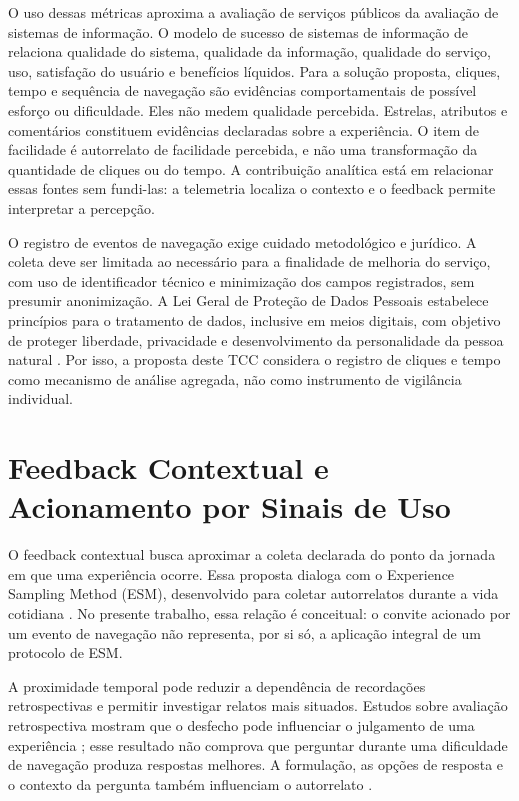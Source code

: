 O uso dessas métricas aproxima a avaliação de serviços públicos da avaliação de sistemas de informação. O modelo de sucesso de sistemas de informação de  relaciona qualidade do sistema, qualidade da informação, qualidade do serviço, uso, satisfação do usuário e benefícios líquidos. Para a solução proposta, cliques, tempo e sequência de navegação são evidências comportamentais de possível esforço ou dificuldade. Eles não medem qualidade percebida. Estrelas, atributos e comentários constituem evidências declaradas sobre a experiência. O item de facilidade é autorrelato de facilidade percebida, e não uma transformação da quantidade de cliques ou do tempo. A contribuição analítica está em relacionar essas fontes sem fundi-las: a telemetria localiza o contexto e o feedback permite interpretar a percepção.

O registro de eventos de navegação exige cuidado metodológico e jurídico. A coleta deve ser limitada ao necessário para a finalidade de melhoria do serviço, com uso de identificador técnico e minimização dos campos registrados, sem presumir anonimização. A Lei Geral de Proteção de Dados Pessoais estabelece princípios para o tratamento de dados, inclusive em meios digitais, com objetivo de proteger liberdade, privacidade e desenvolvimento da personalidade da pessoa natural \cite{brasil2018}. Por isso, a proposta deste TCC considera o registro de cliques e tempo como mecanismo de análise agregada, não como instrumento de vigilância individual.

\section{Feedback Contextual e Acionamento por Sinais de Uso}
\label{sec:2.10}

O feedback contextual busca aproximar a coleta declarada do ponto da jornada em que uma experiência ocorre. Essa proposta dialoga com o Experience Sampling Method (ESM), desenvolvido para coletar autorrelatos durante a vida cotidiana \cite{larson1983,hektner2007}. No presente trabalho, essa relação é conceitual: o convite acionado por um evento de navegação não representa, por si só, a aplicação integral de um protocolo de ESM.

A proximidade temporal pode reduzir a dependência de recordações retrospectivas e permitir investigar relatos mais situados. Estudos sobre avaliação retrospectiva mostram que o desfecho pode influenciar o julgamento de uma experiência \cite{kahneman1993}; esse resultado não comprova que perguntar durante uma dificuldade de navegação produza respostas melhores. A formulação, as opções de resposta e o contexto da pergunta também influenciam o autorrelato \cite{schwarz1999}.

